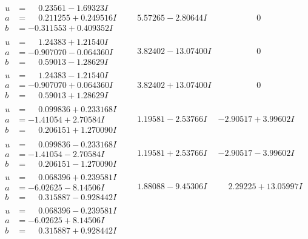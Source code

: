 \documentclass[1p]{elsarticle_modified}
\theoremstyle{definition}
\begin{document}
$$\begin{array}{c|c|c}
\begin{aligned}
u &= \phantom{-}0.23561 - 1.69323 I \\
a &= \phantom{-}0.211255 + 0.249516 I \\
b &= -0.311553 + 0.409352 I\end{aligned}
 & \phantom{-}5.57265 - 2.80644 I & \phantom{-0.000000 } 0 \\ \hline\begin{aligned}
u &= \phantom{-}1.24383 + 1.21540 I \\
a &= -0.907070 - 0.064360 I \\
b &= \phantom{-}0.59013 - 1.28629 I\end{aligned}
 & \phantom{-}3.82402 - 13.07400 I & \phantom{-0.000000 } 0 \\ \hline\begin{aligned}
u &= \phantom{-}1.24383 - 1.21540 I \\
a &= -0.907070 + 0.064360 I \\
b &= \phantom{-}0.59013 + 1.28629 I\end{aligned}
 & \phantom{-}3.82402 + 13.07400 I & \phantom{-0.000000 } 0 \\ \hline\begin{aligned}
u &= \phantom{-}0.099836 + 0.233168 I \\
a &= -1.41054 + 2.70584 I \\
b &= \phantom{-}0.206151 + 1.270090 I\end{aligned}
 & \phantom{-}1.19581 - 2.53766 I & -2.90517 + 3.99602 I \\ \hline\begin{aligned}
u &= \phantom{-}0.099836 - 0.233168 I \\
a &= -1.41054 - 2.70584 I \\
b &= \phantom{-}0.206151 - 1.270090 I\end{aligned}
 & \phantom{-}1.19581 + 2.53766 I & -2.90517 - 3.99602 I \\ \hline\begin{aligned}
u &= \phantom{-}0.068396 + 0.239581 I \\
a &= -6.02625 - 8.14506 I \\
b &= \phantom{-}0.315887 - 0.928442 I\end{aligned}
 & \phantom{-}1.88088 - 9.45306 I & \phantom{-}2.29225 + 13.05997 I \\ \hline\begin{aligned}
u &= \phantom{-}0.068396 - 0.239581 I \\
a &= -6.02625 + 8.14506 I \\
b &= \phantom{-}0.315887 + 0.928442 I\end{aligned}

\end{array}$$
\end{document}
